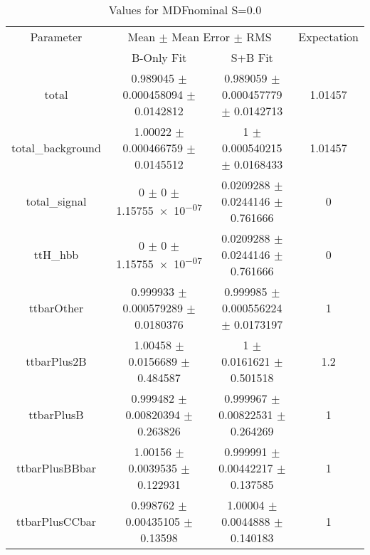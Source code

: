 \begin{table}
\centering
\caption{Values for MDFnominal S=0.0}
\begin{tabular}{cccc}
\toprule
Parameter & \multicolumn{2}{c}{Mean $\pm$ Mean Error $\pm$ RMS} & Expectation\\
 & B-Only Fit & S+B Fit & \\
\midrule
total & \num{0.989045} $\pm$ \num{0.000458094} $\pm$ \num{0.0142812} & \num{0.989059} $\pm$ \num{0.000457779} $\pm$ \num{0.0142713} & \num{1.01457}\\
total\_background & \num{1.00022} $\pm$ \num{0.000466759} $\pm$ \num{0.0145512} & \num{1} $\pm$ \num{0.000540215} $\pm$ \num{0.0168433} & \num{1.01457}\\
total\_signal & \num{0} $\pm$ \num{0} $\pm$ \num{1.15755e-07} & \num{0.0209288} $\pm$ \num{0.0244146} $\pm$ \num{0.761666} & \num{0}\\
ttH\_hbb & \num{0} $\pm$ \num{0} $\pm$ \num{1.15755e-07} & \num{0.0209288} $\pm$ \num{0.0244146} $\pm$ \num{0.761666} & \num{0}\\
ttbarOther & \num{0.999933} $\pm$ \num{0.000579289} $\pm$ \num{0.0180376} & \num{0.999985} $\pm$ \num{0.000556224} $\pm$ \num{0.0173197} & \num{1}\\
ttbarPlus2B & \num{1.00458} $\pm$ \num{0.0156689} $\pm$ \num{0.484587} & \num{1} $\pm$ \num{0.0161621} $\pm$ \num{0.501518} & \num{1.2}\\
ttbarPlusB & \num{0.999482} $\pm$ \num{0.00820394} $\pm$ \num{0.263826} & \num{0.999967} $\pm$ \num{0.00822531} $\pm$ \num{0.264269} & \num{1}\\
ttbarPlusBBbar & \num{1.00156} $\pm$ \num{0.0039535} $\pm$ \num{0.122931} & \num{0.999991} $\pm$ \num{0.00442217} $\pm$ \num{0.137585} & \num{1}\\
ttbarPlusCCbar & \num{0.998762} $\pm$ \num{0.00435105} $\pm$ \num{0.13598} & \num{1.00004} $\pm$ \num{0.0044888} $\pm$ \num{0.140183} & \num{1}\\
\bottomrule
\end{tabular}
\end{table}